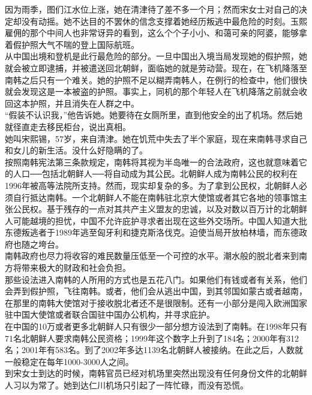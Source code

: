因为雨季，图们江水位上涨，她在清津待了差不多一个月；然而宋女士对自己的决定却没有动摇。她不达目的不罢休的信念支撑着她经历叛逃中最危险的时刻。玉熙雇佣的那个中间人也非常讶异的看到，这么个个子小小、和蔼可亲的阿婆，能够拿着假护照大气不喘的登上国际航班。\\

从中国出境和登机是此行最危险的部分。一旦中国出入境当局发现她的假护照，她就会被立即逮捕，并被遣送回北朝鲜，面临她的就是劳动营。现在，在飞机降落至南韩之后只有一个难关。她的护照不足以糊弄南韩人，在例行的检查中，他们很快就会发现这是一本被盗的护照。事实上，同机的那个年轻人在飞机降落之前就会收回这本护照，并且消失在人群之中。\\

“假装不认识我，”他告诉她。她要待在女厕所里，直到他安全的出了机场。然后她就径直走去移民柜台，说出真相。\\

她叫宋熙锡，57岁，来自清津。她在饥荒中失去了半个家庭，现在来南韩寻求自己和女儿的新生活。没什么好隐瞒的了。\\

按照南韩宪法第三条款规定，南韩将其视为半岛唯一的合法政府，这也就意味着它的人口──包括北朝鲜人──将自动成为其公民。北朝鲜人成为南韩公民的权利在1996年被高等法院所支持。然而，现实却复杂的多。为了拿到公民权，北朝鲜人必须自行抵达南韩。一个北朝鲜人不能在南韩驻北京大使馆或者其它各地的领事馆主张公民权。基于残存的一点对其共产主义盟友的忠诚，以及对数以百万计的北朝鲜人可能越境的担忧，中国不允许庇护寻求者出现在这些外交场所。中国人知道大批东德叛逃者于1989年逃至匈牙利和捷克斯洛伐克。迫使当局开放柏林墙，而东德政府也随之垮台。\\

南韩政府也尽力将收容的难民数量压低至一个可控的水平。潮水般的脱北者来到南方将带来极大的财政和社会负担。\\

那些设法进入南韩的人所用的方式也是五花八门。如果他们有钱或者有关系，他们会弄到假护照，飞往南韩。或者，他们会从逃出中国，到其邻国如蒙古或者越南，在那里的南韩大使馆对于接收脱北者还不是很限制。还有一小部分是闯入欧洲国家驻中国大使馆或者联合国驻中国办公机构，并寻求庇护。\\

在中国的10万或者更多北朝鲜人只有很少一部分想方设法到了南韩。在1998年只有71名北朝鲜人要求南韩公民资格；1999年这个数字上升到了184名；2000年有312名；2001年有583名。到了2002年多达1139名北朝鲜人被接纳。在此之后，人数就一般稳定在每年1000-3000人之间。\\

到宋女士到达的时候，南韩官员已经对机场里突然出现没有任何身份文件的北朝鲜人习以为常了。她到达仁川机场只引起了一阵忙碌，而没有恐慌。\\

